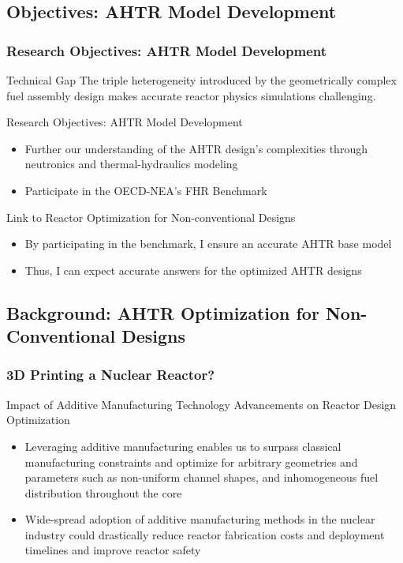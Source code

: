 \subsection{Objectives: AHTR Model Development}
    \begin{frame}
        \frametitle{Research Objectives: AHTR Model Development}
        \begin{block}{Technical Gap}
            The triple heterogeneity introduced by the geometrically complex 
            fuel assembly design makes accurate reactor physics simulations challenging. 
        \end{block}
        \begin{block}{Research Objectives: AHTR Model Development}
        \begin{itemize}
            \item Further our understanding of the AHTR design's complexities 
            through neutronics and thermal-hydraulics modeling
            \item Participate in the OECD-NEA's FHR Benchmark 
        \end{itemize}
        \end{block}
        \begin{block}{Link to Reactor Optimization for Non-conventional Designs}
        \begin{itemize}
        \item By participating in the benchmark, I ensure an accurate AHTR base model
        \item Thus, I can expect accurate answers for the optimized AHTR designs
        \end{itemize}
        \end{block}
    \end{frame}

\subsection{Background: AHTR Optimization for Non-Conventional Designs}
\begin{frame}
    \frametitle{3D Printing a Nuclear Reactor?}
    \begin{block}{Impact of Additive Manufacturing Technology Advancements on 
        Reactor Design Optimization}
        \begin{itemize}
            \item Leveraging additive manufacturing enables us to surpass classical 
            manufacturing constraints and optimize for arbitrary geometries and parameters 
            such as non-uniform channel shapes, and inhomogeneous fuel distribution 
            throughout the core
            \item Wide-spread adoption of additive manufacturing methods in the nuclear industry 
            could drastically reduce reactor fabrication costs and deployment timelines 
            and improve reactor safety
          \end{itemize}
    \end{block}
  \end{frame}

